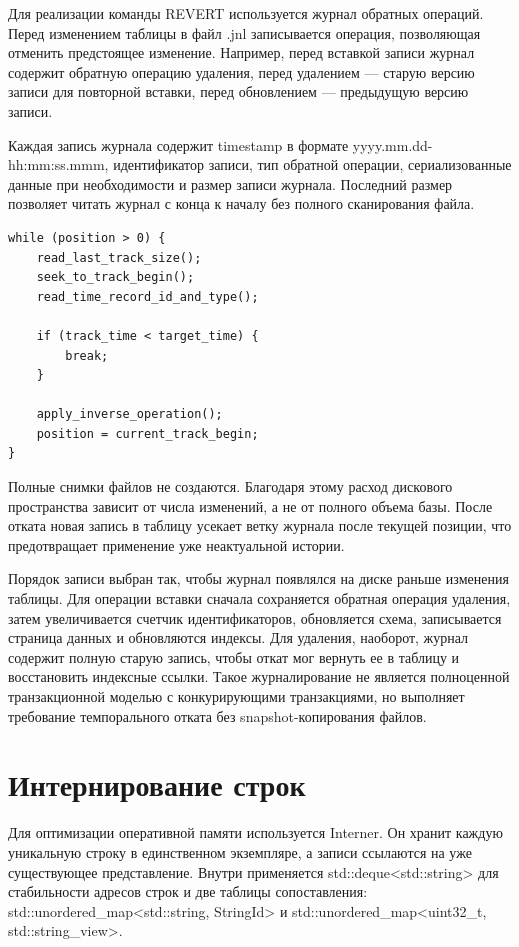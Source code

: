 \documentclass[a4paper,14pt]{extarticle}
\renewcommand{\texttt}[1]{\textrm{#1}}
\begin{document}
Для реализации команды \texttt{REVERT} используется журнал обратных операций. Перед изменением таблицы в файл \texttt{.jnl} записывается операция, позволяющая отменить предстоящее изменение. Например, перед вставкой записи журнал содержит обратную операцию удаления, перед удалением — старую версию записи для повторной вставки, перед обновлением — предыдущую версию записи.

Каждая запись журнала содержит timestamp в формате \texttt{yyyy.mm.dd-hh:mm:ss.mmm}, идентификатор записи, тип обратной операции, сериализованные данные при необходимости и размер записи журнала. Последний размер позволяет читать журнал с конца к началу без полного сканирования файла.

\begin{lstlisting}[style=qdbcpp,caption={Логика чтения журнала при откате}]
while (position > 0) {
    read_last_track_size();
    seek_to_track_begin();
    read_time_record_id_and_type();

    if (track_time < target_time) {
        break;
    }

    apply_inverse_operation();
    position = current_track_begin;
}
\end{lstlisting}

Полные снимки файлов не создаются. Благодаря этому расход дискового пространства зависит от числа изменений, а не от полного объема базы. После отката новая запись в таблицу усекает ветку журнала после текущей позиции, что предотвращает применение уже неактуальной истории.

Порядок записи выбран так, чтобы журнал появлялся на диске раньше изменения таблицы. Для операции вставки сначала сохраняется обратная операция удаления, затем увеличивается счетчик идентификаторов, обновляется схема, записывается страница данных и обновляются индексы. Для удаления, наоборот, журнал содержит полную старую запись, чтобы откат мог вернуть ее в таблицу и восстановить индексные ссылки. Такое журналирование не является полноценной транзакционной моделью с конкурирующими транзакциями, но выполняет требование темпорального отката без snapshot-копирования файлов.

\section{Интернирование строк}

Для оптимизации оперативной памяти используется Interner. Он хранит каждую уникальную строку в единственном экземпляре, а записи ссылаются на уже существующее представление. Внутри применяется \texttt{std::deque<std::string>} для стабильности адресов строк и две таблицы сопоставления: \texttt{std::unordered\_map<std::string, StringId>} и \texttt{std::unordered\_map<uint32\_t, std::string\_view>}.
\end{document}
